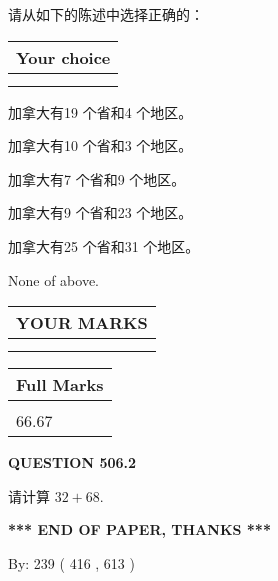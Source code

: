 \documentclass{ctexart}
\begin{document}
  
请从如下的陈述中选择正确的：
  
  
\noindent\hspace{3.0in} \begin{tabular}{|l|}
\hline
Your choice \\
\hline
 \\ 
 \\ 
\hline
\end{tabular}
  
  
 
 
加拿大有19 个省和4 个地区。
 
 
加拿大有10 个省和3 个地区。
 
 
加拿大有7 个省和9 个地区。
 
 
加拿大有9 个省和23 个地区。
 
 
加拿大有25 个省和31 个地区。
 
 
 None of above.
 
 
  
\vspace{0.2in}
  
\noindent\begin{tabular}{|l|}
\hline
 YOUR MARKS  \\
\hline
 \\ 
 \\ 
\hline
\end{tabular}
\hspace{0.05in} \begin{tabular}{|l|}
\hline
 Full Marks  \\
\hline
 \\ 
66.67 \\
\hline
\end{tabular}
{\textbf{\Large{QUESTION
506.2 
}}}
  
  
 
请计算 $ %
32 +  %
68 $.
 

 

 
   
   
 \vspace{0.2in}
 
   
   
   
   
\vspace{1.0in} 
{\textbf{\large{ *** END OF PAPER, THANKS *** }}} 
   
   
\hspace{1.0in} By: 
 239 ( 416 ,  613 )
   
\end{document}
